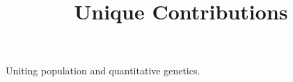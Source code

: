 \documentclass[11pt,letterpaper]{article}
\title{Unique Contributions}
\date{}
\begin{document}
\maketitle
\noindent

Uniting population and quantitative genetics.


\end{document}
